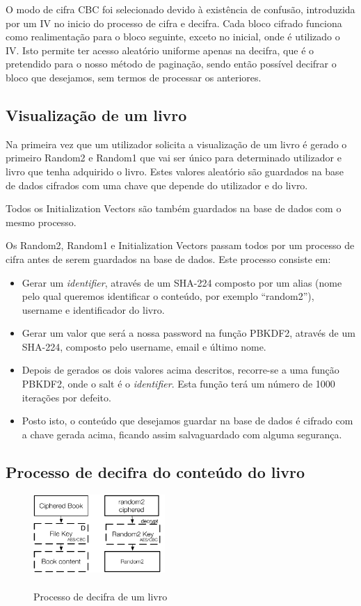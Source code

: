 \documentclass[pdftex,12pt,a4paper]{report}
\begin{document}
O modo de cifra CBC foi selecionado devido à existência de confusão, introduzida por um IV no inicio do processo de cifra e decifra. Cada bloco cifrado funciona como realimentação para o bloco seguinte, exceto no inicial, onde é utilizado o IV. Isto permite ter acesso aleatório uniforme apenas na decifra, que é o pretendido para o nosso método de paginação, sendo então possível decifrar o bloco que desejamos, sem termos de processar os anteriores. 

\subsection{Visualização de um livro}
Na primeira vez que um utilizador solicita a visualização de um livro é gerado o primeiro Random2 e Random1 que vai ser único para determinado utilizador e livro que tenha adquirido o livro. Estes valores aleatório são guardados na base de dados cifrados com uma chave que depende do utilizador e do livro.

Todos os Initialization Vectors são também guardados na base de dados com o mesmo processo.

Os Random2, Random1 e Initialization Vectors passam todos por um processo de cifra antes de serem guardados na base de dados. Este processo consiste em:

\begin{itemize}
\item Gerar um \textit{identifier}, através de um SHA-224 composto por um alias (nome pelo qual queremos identificar o conteúdo, por exemplo “random2”), username e identificador do livro.
\item Gerar um valor que será a nossa password na função PBKDF2, através de um SHA-224, composto pelo username, email e último nome.
\item Depois de gerados os dois valores acima descritos, recorre-se a uma função PBKDF2, onde o salt é o \textit{identifier}. Esta função terá um número de 1000 iterações por defeito.
\item Posto isto, o conteúdo que desejamos guardar na base de dados é cifrado com a chave gerada acima, ficando assim salvaguardado com alguma segurança.
\end{itemize}

\subsection{Processo de decifra do conteúdo do livro}

\begin{figure}[!htb]
\center
 \includegraphics[width=50mm,scale=1]{book-decipher-process.pdf}
 \caption{\\ Processo de decifra de um livro}
 \label{fig:eer}
\end{figure}
\end{document}
